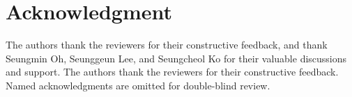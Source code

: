 \section*{Acknowledgment}\label{sec:ack}

\ifnum{}
The authors thank the reviewers for their constructive feedback, and thank Seungmin Oh, Seunggeun Lee, and Seungcheol Ko for their valuable discussions and support.
\else
The authors thank the reviewers for their constructive feedback. Named acknowledgments are omitted for double-blind review.
\fi